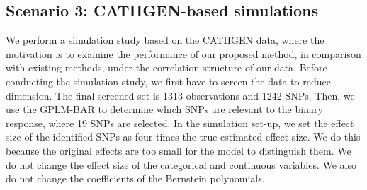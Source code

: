 \documentclass[11pt]{article}
\begin{document}
\subsection*{Scenario 3: CATHGEN-based simulations}
We perform a simulation study based on the CATHGEN data, where the motivation is to examine the performance of our proposed method, in comparison with existing methods, under the correlation structure of our data. Before conducting the simulation study, we first have to screen the data to reduce dimension. The final screened set is 1313 observations and 1242 SNPs. Then, we use the GPLM-BAR to determine which SNPs are relevant to the binary response, where 19 SNPs are selected. In the simulation set-up, we set the effect size of the identified SNPs as four times the true estimated effect size. We do this because the original effects are too small for the model to distinguish them. We do not change the effect size of the categorical and continuous variables. We also do not change the coefficients of the Bernstein polynomials.
\end{document}
